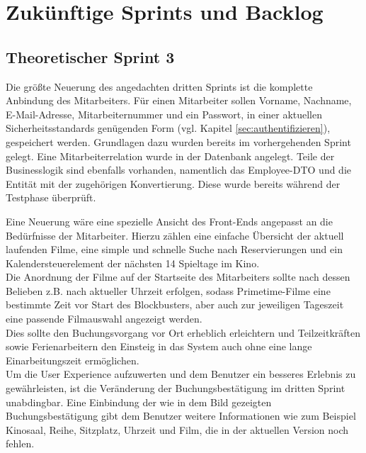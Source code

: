 \section{Zukünftige Sprints und Backlog}

\subsection{Theoretischer Sprint 3}
\label{ssec:theoretischer_sprint}
\multipleauthorsection{\authorRF}{\authorEJ}
Die größte Neuerung des angedachten dritten Sprints ist die komplette Anbindung des Mitarbeiters.
Für einen Mitarbeiter sollen Vorname, Nachname, E-Mail-Adresse, Mitarbeiternummer und ein Passwort, in einer aktuellen Sicherheitsstandards genügenden Form (vgl. Kapitel \vref{sec:authentifizieren}), gespeichert werden.
Grundlagen dazu wurden bereits im vorhergehenden Sprint gelegt.
Eine Mitarbeiterrelation wurde in der Datenbank angelegt.
Teile der Businesslogik sind ebenfalls vorhanden, namentlich das Employee-\acs{DTO} und die Entität mit der zugehörigen Konvertierung.
Diese wurde bereits während der Testphase überprüft.

Eine Neuerung wäre eine spezielle Ansicht des Front-Ends angepasst an die Bedürfnisse der Mitarbeiter.
Hierzu zählen eine einfache Übersicht der aktuell laufenden Filme, eine simple und schnelle Suche nach Reservierungen und ein Kalendersteuerelement der nächsten 14 Spieltage im Kino. \\
Die Anordnung der Filme auf der Startseite des Mitarbeiters sollte nach dessen Belieben z.B. nach aktueller Uhrzeit erfolgen, sodass Primetime-Filme eine bestimmte Zeit vor Start des Blockbusters, aber auch zur jeweiligen Tageszeit eine passende Filmauswahl angezeigt werden. \\
Dies sollte den Buchungsvorgang vor Ort erheblich erleichtern und Teilzeitkräften sowie Ferienarbeitern den Einsteig in das System auch ohne eine lange Einarbeitungszeit ermöglichen. \\

Um die User Experience aufzuwerten und dem Benutzer ein besseres Erlebnis zu gewährleisten, ist die Veränderung der Buchungsbestätigung im dritten Sprint unabdingbar.
Eine Einbindung der wie in dem Bild gezeigten Buchungsbestätigung gibt dem Benutzer weitere Informationen wie zum Beispiel Kinosaal, Reihe, Sitzplatz, Uhrzeit und Film, die in der aktuellen Version noch fehlen.

